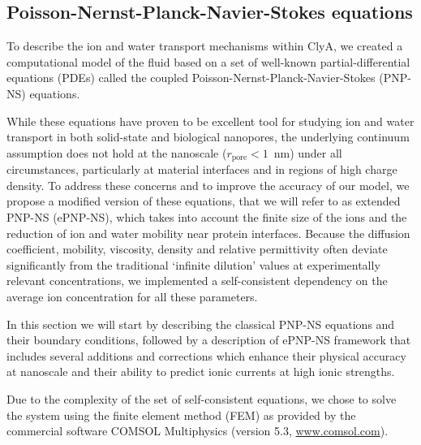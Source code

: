 \documentclass[journal=ancac3, manuscript=article, etalmode=truncate,maxauthors=0]{achemso}
\begin{document}
\subsection{Poisson-Nernst-Planck-Navier-Stokes equations}
To describe the ion and water transport mechanisms within ClyA, we created a computational model of the fluid
based on a set of well-known partial-differential equations (PDEs) called the coupled
Poisson-Nernst-Planck-Navier-Stokes (PNP-NS) equations. 

While these equations have proven to be excellent tool for studying ion and water transport in both 
solid-state\cite{daiguji2004,lu2012,chaudhry2014,rempfer2016,lin2016} and biological 
nanopores,\cite{eisenberg1996,simakov2010,pederson2015} the underlying continuum assumption does not hold at 
the nanoscale ($r_\text{pore}<1$~nm) under all circumstances, particularly at material 
interfaces\cite{vo2016} and in regions of high charge density.\cite{corry2000} To address these concerns and 
to improve the accuracy of our model, we propose a modified version of these equations, that we will refer to 
as extended PNP-NS (ePNP-NS), which takes into account the finite size of the ions\cite{borukhov1997,lu2011} 
and the reduction of ion and water mobility near protein interfaces.\cite{makarov1998, pronk2013} Because the 
diffusion coefficient, mobility, viscosity, density\cite{} and relative permittivity\cite{gavish2016} often 
deviate significantly from the traditional `infinite dilution' values at experimentally relevant 
concentrations, we implemented a self-consistent dependency on the average ion concentration for all these 
parameters.

In this section we will start by describing the classical PNP-NS equations and their boundary conditions,
followed by a description of ePNP-NS framework that includes several additions and corrections which enhance
their physical accuracy at nanoscale and their ability to predict ionic currents at high ionic strengths.

Due to the complexity of the set of self-consistent equations, we chose to solve the system using the finite
element method (FEM) as provided by the commercial software COMSOL Multiphysics (version 5.3,
\href{www.comsol.com}{www.comsol.com}).
\end{document}
